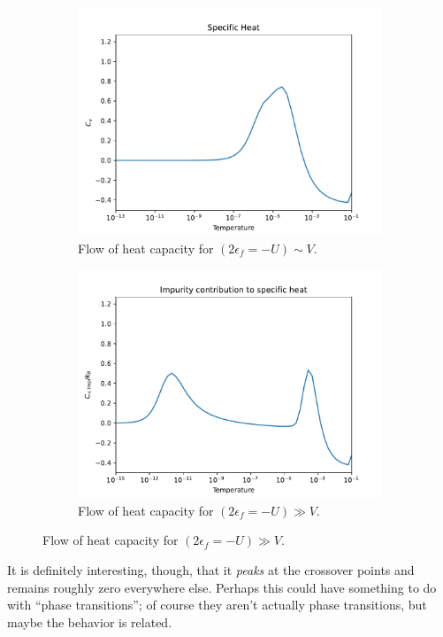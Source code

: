 \begin{figure}
  \centering
  \begin{subfigure}[b]{0.4\linewidth}
    \centering
    \includegraphics[width=\linewidth]{./gfx/results/Cv_lowU.pdf}
    \caption{Flow of heat capacity for $(2\epsilon_f = -U) \sim V$.}
    \label{fig:5-results-cv-lowu}
  \end{subfigure}
  \begin{subfigure}[b]{0.4\linewidth}
    \centering
    \includegraphics[width=\linewidth]{./gfx/results/Cv.pdf}
    \caption{Flow of heat capacity for $(2\epsilon_f = -U) \gg V$.}
    \label{fig:5-results-cv}
  \end{subfigure}
\end{figure}

It is definitely interesting, though, that it \textit{peaks} at the crossover points and remains roughly zero everywhere else. Perhaps this could have something to do with ``phase transitions''; of course they aren't actually phase transitions, but maybe the behavior is related.










